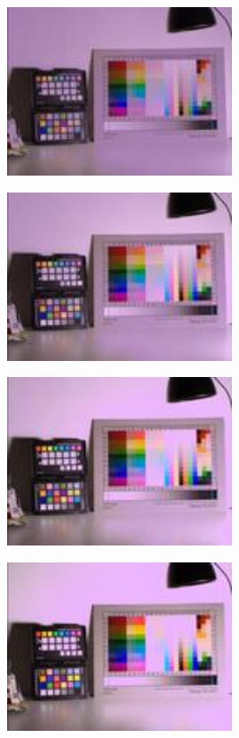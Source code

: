 {\begin{center}
\includegraphics[height=5cm]{images/100ms-10ms-32-tiny}
\end{center}

\begin{center}
\includegraphics[height=5cm]{images/100ms-20ms-32-tiny}
\end{center}

\begin{center}
\includegraphics[height=5cm]{images/100ms-35ms-32-tiny}
\end{center}

\begin{center}
\includegraphics[height=5cm]{images/100ms-50ms-32-tiny}
\end{center}

}
